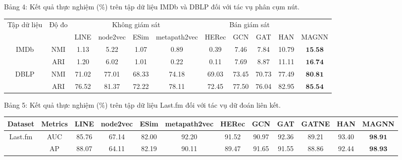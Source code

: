 Bảng 4: Kết quả thực nghiệm (\%) trên tập dữ liệu IMDb và DBLP đối với tác vụ phân cụm nút. 
\begin{center}
\begin{tabular}{|c|c|c|c|c|c|c|c|c|c|c|}
\hline
\multirow{2}{*}{Tập dữ liệu} & \multirow{2}{*}{Độ đo} & \multicolumn{4}{|c|}{Không giám sát} & \multicolumn{4}{c|}{Bán giám sát} &  \\
\cline { 3 - 11 }
 &  & LINE & node2vec & ESim & metapath2vec & HERec & GCN & GAT & HAN & MAGNN \\
\hline
\multirow{2}{*}{IMDb} & NMI & 1.13 & 5.22 & 1.07 & 0.89 & 0.39 & 7.46 & 7.84 & 10.79 & $\mathbf{1 5 . 5 8}$ \\
\cline { 2 - 11 }
 & ARI & 1.20 & 6.02 & 1.01 & 0.22 & 0.11 & 7.69 & 8.87 & 11.11 & $\mathbf{1 6 . 7 4}$ \\
\hline
\multirow{2}{*}{DBLP} & NMI & 71.02 & 77.01 & 68.33 & 74.18 & 69.03 & 73.45 & 70.73 & 77.49 & $\mathbf{8 0 . 8 1}$ \\
\cline { 2 - 11 }
 & ARI & 76.52 & 81.37 & 72.22 & 78.11 & 72.45 & 77.50 & 76.04 & 82.95 & $\mathbf{8 5 . 5 4}$ \\
\hline
\end{tabular}
\end{center}


Bảng 5: Kết quả thực nghiệm (\%) trên tập dữ liệu Last.fm đối với tác vụ dữ đoán liên kết.
\begin{center}
\begin{tabular}{|c|c|c|c|c|c|c|c|c|c|c|c|}
\hline
Dataset & Metrics & LINE & node2vec & ESim & metapath2vec & HERec & GCN & GAT & GATNE & HAN & MAGNN \\
\hline
\multirow{2}{*}{Last.fm} & AUC & 85.76 & 67.14 & 82.00 & 92.20 & 91.52 & 90.97 & 92.36 & 89.21 & 93.40 & $\mathbf{9 8 . 9 1}$ \\
\cline { 2 - 11 }
 & AP & 88.07 & 64.11 & 82.19 & 90.11 & 89.47 & 91.65 & 91.55 & 88.86 & 92.44 & $\mathbf{9 8 . 9 3}$ \\
\hline
\end{tabular}
\end{center}

